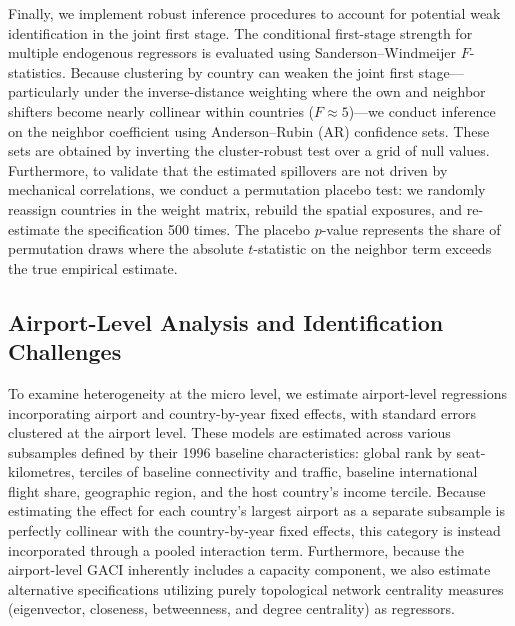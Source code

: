 \documentclass[12pt]{extarticle}
\begin{document}
Finally, we implement robust inference procedures to account for potential weak identification in the joint first stage. The conditional first-stage strength for multiple endogenous regressors is evaluated using Sanderson--Windmeijer $F$-statistics. Because clustering by country can weaken the joint first stage—particularly under the inverse-distance weighting where the own and neighbor shifters become nearly collinear within countries ($F \approx 5$)—we conduct inference on the neighbor coefficient using Anderson--Rubin (AR) confidence sets. These sets are obtained by inverting the cluster-robust test over a grid of null values. Furthermore, to validate that the estimated spillovers are not driven by mechanical correlations, we conduct a permutation placebo test: we randomly reassign countries in the weight matrix, rebuild the spatial exposures, and re-estimate the specification 500 times. The placebo $p$-value represents the share of permutation draws where the absolute $t$-statistic on the neighbor term exceeds the true empirical estimate.

\subsection*{Airport-Level Analysis and Identification Challenges}

To examine heterogeneity at the micro level, we estimate airport-level regressions incorporating airport and country-by-year fixed effects, with standard errors clustered at the airport level. These models are estimated across various subsamples defined by their 1996 baseline characteristics: global rank by seat-kilometres, terciles of baseline connectivity and traffic, baseline international flight share, geographic region, and the host country's income tercile. Because estimating the effect for each country's largest airport as a separate subsample is perfectly collinear with the country-by-year fixed effects, this category is instead incorporated through a pooled interaction term. Furthermore, because the airport-level GACI inherently includes a capacity component, we also estimate alternative specifications utilizing purely topological network centrality measures (eigenvector, closeness, betweenness, and degree centrality) as regressors.
\end{document}
